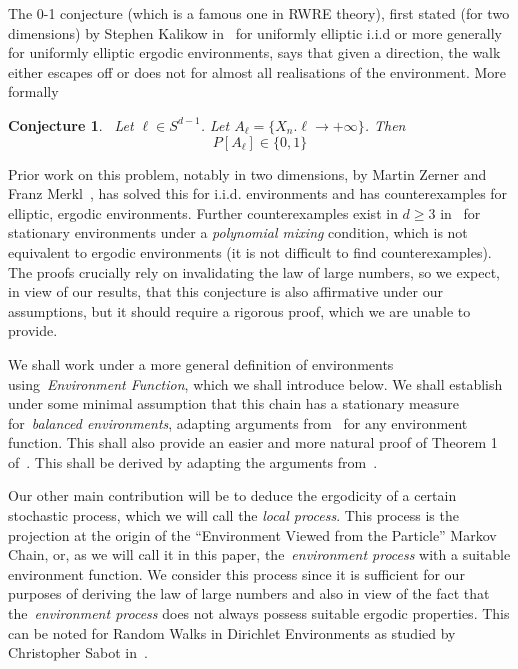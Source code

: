 \documentclass[final]{aomart}
\def\mathbb#1{#1}%
\theoremstyle{plain}
\newtheorem{conjecture}[theorem]{Conjecture}
\theoremstyle{definition}
\theoremstyle{remark}
\begin{document}
The 0-1 conjecture (which is a famous one in RWRE theory), first stated (for two dimensions) by Stephen Kalikow in~\cite{kalikow1981generalized} for uniformly elliptic i.i.d or more generally for uniformly elliptic ergodic environments, says that given a direction, the walk either escapes off or does not for almost all realisations of the environment. More formally \begin{conjecture}~\label{Kaliku}
    Let $\ell \in S^{d-1}$. Let $A_{\ell} = \{ X_n.\ell \to +\infty\}$. Then \[
    \mathbb{P}[A_{\ell}]\in \{0,1\}
    \]
\end{conjecture}
Prior work on this problem, notably in two dimensions, by Martin Zerner and Franz Merkl~\cite{merkl2001zero}, has solved this for i.i.d. environments and has counterexamples for elliptic, ergodic environments. Further counterexamples exist in $d \geq 3$ in~\cite{bramson2006shortest} for stationary environments under a \textit{polynomial mixing} condition, which is not equivalent to ergodic environments (it is not difficult to find counterexamples). The proofs crucially rely on invalidating the law of large numbers, so we expect, in view of our results, that this conjecture is also affirmative under our assumptions, but it should require a rigorous proof, which we are unable to provide.

We shall work under a more general definition of environments using~\textit{Environment Function}, which we shall introduce below. We shall establish under some minimal assumption that this chain has a stationary measure for~\textit{balanced environments}, adapting arguments from~\cite{Lawler1982} for any environment function. This shall also provide an easier and more natural proof of Theorem 1 of~\cite{guo2012quenched}. This shall be derived by adapting the arguments from~\cite{Lawler1982}. 

Our other main contribution will be to deduce the ergodicity of a certain stochastic process, which we will call the \textit{local process}. This process is the projection at the origin of the ``Environment Viewed from the Particle'' Markov Chain, or, as we will call it in this paper, the~\textit{environment process} with a suitable environment function. We consider this process since it is sufficient for our purposes of deriving the law of large numbers and also in view of the fact that the~\textit{environment process} does not always possess suitable ergodic properties. This can be noted for Random Walks in Dirichlet Environments as studied by Christopher Sabot in~\cite{11}. 
\end{document}
